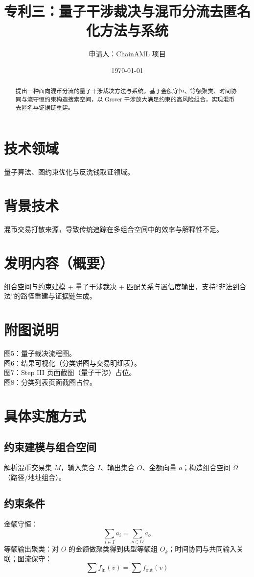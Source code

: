 \documentclass[12pt]{article}
\title{专利三：量子干涉裁决与混币分流去匿名化方法与系统}
\author{申请人：ChainAML 项目}
\date{\today}
\begin{document}
\maketitle

\begin{abstract}
提出一种面向混币分流的量子干涉裁决方法与系统，基于金额守恒、等额聚类、时间协同与流守恒约束构造搜索空间，以 Grover 干涉放大满足约束的高风险组合，实现混币去匿名与证据链重建。
\end{abstract}

\section*{技术领域}
量子算法、图约束优化与反洗钱取证领域。

\section*{背景技术}
混币交易打散来源，导致传统追踪在多组合空间中的效率与解释性不足。

\section*{发明内容（概要）}
组合空间与约束建模 + 量子干涉裁决 + 匹配关系与置信度输出，支持“非法到合法”的路径重建与证据链生成。

\section*{附图说明}
图5：量子裁决流程图。\\
图6：结果可视化（分类饼图与交易明细表）。\\
图7：Step III 页面截图（量子干涉）占位。\\
图8：分类列表页面截图占位。

\section*{具体实施方式}
\subsection*{约束建模与组合空间}
解析混币交易集 $M$，输入集合 $I$、输出集合 $O$、金额向量 $a$；构造组合空间 $\Omega$（路径/地址组合）。

\subsection*{约束条件}
金额守恒：
\begin{equation}
\sum\limits_{i\in I} a_i = \sum\limits_{o\in O} a_o
\end{equation}
等额输出聚类：对 $O$ 的金额做聚类得到典型等额组 $O_k$；时间协同与共同输入关联；图流保守：
\begin{equation}
\sum f_{\text{in}}(v) = \sum f_{\text{out}}(v)
\end{equation}
\end{document}
